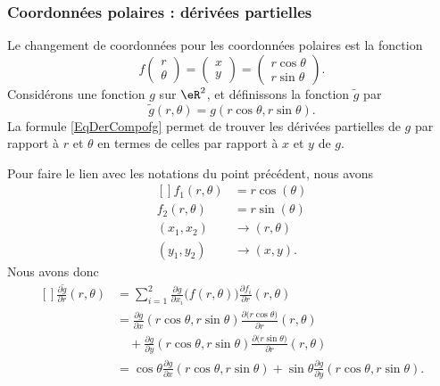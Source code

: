\subsubsection{Coordonnées polaires : dérivées partielles}

Le changement de coordonnées pour les coordonnées polaires est la fonction
\begin{equation}
	f\begin{pmatrix}
		r \\
		\theta
	\end{pmatrix}=\begin{pmatrix}
		x \\
		y
	\end{pmatrix}=\begin{pmatrix}
		r\cos\theta \\
		r\sin\theta
	\end{pmatrix}.
\end{equation}
Considérons une fonction \( g\) sur \( \eR^2\), et définissons la fonction \( \tilde g\) par
\begin{equation}
	\tilde g(r,\theta)=g(r\cos\theta,r\sin\theta).
\end{equation}
La formule \eqref{EqDerCompofg} permet de trouver les dérivées partielles de \( g\) par rapport à \( r\) et \( \theta\) en termes de celles par rapport à \( x\) et \( y\) de \( g\).

Pour faire le lien avec les notations du point précédent, nous avons
\begin{equation}
	\begin{aligned}[]
		f_1(r,\theta) & =r\cos(\theta) \\
		f_2(r,\theta) & =r\sin(\theta) \\
		(x_1,x_2)     & \to(r,\theta)  \\
		(y_1,y_2)     & \to(x,y).
	\end{aligned}
\end{equation}
Nous avons donc
\begin{equation}
	\begin{aligned}[]
		\frac{ \partial \tilde g }{ \partial r }(r,\theta) & =\sum_{i=1}^2\frac{ \partial g }{ \partial x_i }\big( f(r,\theta) \big)\frac{ \partial f_i }{ \partial r }(r,\theta)                        \\
		                                                   & =\frac{ \partial g }{ \partial x }(r\cos\theta,r\sin\theta)\frac{ \partial \big( r\cos\theta \big) }{ \partial r }(r,\theta)                \\
		                                                   & \quad+\frac{ \partial g }{ \partial y }(r\cos\theta,r\sin\theta)\frac{ \partial \big( r\sin\theta\big) }{ \partial r }(r,\theta)            \\
		                                                   & =\cos\theta\frac{ \partial g }{ \partial x }(r\cos\theta,r\sin\theta)+\sin\theta\frac{ \partial g }{ \partial y }(r\cos\theta,r\sin\theta).
	\end{aligned}
\end{equation}


